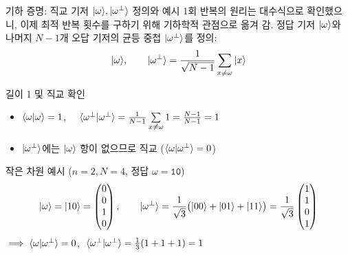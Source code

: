 \documentclass[aspectratio=169, 10pt]{beamer}
\begin{document}
\begin{frame}{기하 증명: 직교 기저 $|\omega\rangle, |\omega^\perp\rangle$ 정의와 예시}
    1회 반복의 원리는 대수식으로 확인했으니, 이제 최적 반복 횟수를 구하기 위해 기하학적 관점으로 옮겨 감. 정답 기저 $|\omega\rangle$와 나머지 $N-1$개 오답 기저의 균등 중첩 $|\omega^\perp\rangle$를 정의:
    \vspace{-0.1cm}
    $$|\omega\rangle, \qquad |\omega^\perp\rangle = \frac{1}{\sqrt{N-1}}\sum_{x \neq \omega}|x\rangle$$
    \vspace{-0.15cm}
    \pause
    \begin{qcblock}{길이 1 및 직교 확인}
        \begin{itemize}
            \item $\langle\omega|\omega\rangle = 1$, $\quad \langle\omega^\perp|\omega^\perp\rangle = \frac{1}{N-1}\sum\limits_{x\neq\omega} 1 = \frac{N-1}{N-1} = 1$
            \pause
            \item $|\omega^\perp\rangle$에는 $|\omega\rangle$ 항이 없으므로 직교 ($\langle\omega|\omega^\perp\rangle = 0$)
        \end{itemize}
    \end{qcblock}
    \pause
    \vspace{0.02cm}
    \begin{qctip}{작은 차원 예시 ($n=2, N=4$, 정답 $\omega=\texttt{10}$)}
        {\renewcommand{\arraystretch}{0.85}\footnotesize
        $$|\omega\rangle = |10\rangle = \begin{pmatrix} 0 \\ 0 \\ 1 \\ 0 \end{pmatrix}, \qquad |\omega^\perp\rangle = \frac{1}{\sqrt{3}}\big(|00\rangle + |01\rangle + |11\rangle\big) = \frac{1}{\sqrt{3}}\begin{pmatrix} 1 \\ 1 \\ 0 \\ 1 \end{pmatrix}$$
        }
        \vspace{-0.15cm}
        $\implies \langle\omega|\omega^\perp\rangle = 0$, $\;\langle\omega^\perp|\omega^\perp\rangle = \frac{1}{3}(1+1+1) = 1$
    \end{qctip}
\end{frame}
\end{document}
